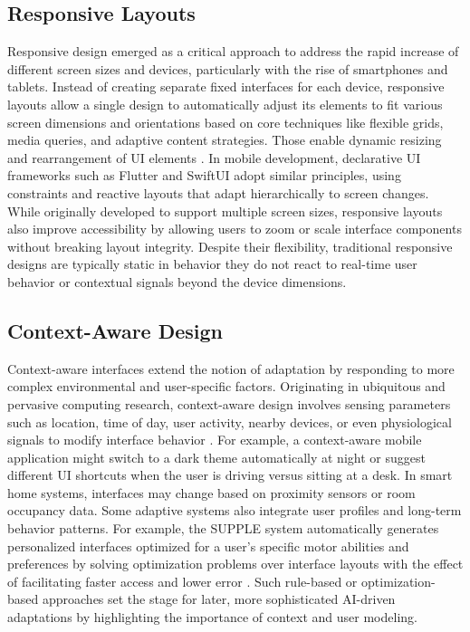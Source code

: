\documentclass[openany]{book}
\begin{document}
\subsection{Responsive Layouts}
Responsive design emerged as a critical approach to address the rapid increase of different screen sizes and devices, particularly with the rise of smartphones and tablets. Instead of creating separate fixed interfaces for each device, responsive layouts allow a single design to automatically adjust its elements to fit various screen dimensions and orientations based on core techniques like flexible grids, media queries, and adaptive content strategies.  
Those enable dynamic resizing and rearrangement of UI elements \cite{Marcotte2010Responsive}. In mobile development, declarative UI frameworks such as Flutter and SwiftUI adopt similar principles, using constraints and reactive layouts that adapt hierarchically to screen changes.  
While originally developed to support multiple screen sizes, responsive layouts also improve accessibility by allowing users to zoom or scale interface components without breaking layout integrity. Despite their flexibility, traditional responsive designs are typically static in behavior they do not react to real-time user behavior or contextual signals beyond the device dimensions.

\subsection{Context-Aware Design}
Context-aware interfaces extend the notion of adaptation by responding to more complex environmental and user-specific factors. Originating in ubiquitous and pervasive computing research, context-aware design involves sensing parameters such as location, time of day, user activity, nearby devices, or even physiological signals to modify interface behavior \cite{Schilit1994ContextAware, Dey2001Context}. For example, a context-aware mobile application might switch to a dark theme automatically at night or suggest different UI shortcuts when the user is driving versus sitting at a desk. In smart home systems, interfaces may change based on proximity sensors or room occupancy data.  
Some adaptive systems also integrate user profiles and long-term behavior patterns. For example, the SUPPLE system automatically generates personalized interfaces optimized for a user's specific motor abilities and preferences by solving optimization problems over interface layouts with the effect of facilitating faster access and lower error \cite{Gajos2008SUPPLE}. Such rule-based or optimization-based approaches set the stage for later, more sophisticated AI-driven adaptations by highlighting the importance of context and user modeling.
\end{document}
